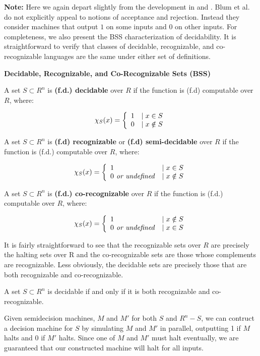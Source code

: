 \textbf{Note:} Here we again depart slightly from the development in
\cite{B89} and \cite{B98}.  Blum et al. do not explicitly appeal to
notions of acceptance and rejection.  Instead they consider machines
that output $1$ on some inputs and $0$ on other inputs.  For
completeness, we also present the BSS characterization of
decidability.  It is straightforward to verify that classes of
decidable, recognizable, and co-recognizable languages are the same
under either set of definitions.

\begin{definition}{\textbf{Decidable, Recognizable, and Co-Recognizable Sets (BSS)}}

  A set $S \subset R^n$ is \textbf{(f.d.) decidable} over $R$ if the
  function  is (f.d) computable over $R$,
  where:
  
  $$\chi_S(x) =  \left\{ \begin{array}{ll} 1 & \mid x \in S \\ 0 & \mid x \notin S \end{array} \right.$$
  \vspace{\baselineskip}
  
  A set $S \subset R^n$ is \textbf{(f.d) recognizable} or
  \textbf{(f.d) semi-decidable} over $R$ if the function
   is (f.d.) computable over $R$, where:
  
  $$\chi_S(x) = \left\{ \begin{array}{ll} 1 & \mid x \in S \\ 0 \text{\emph{ or undefined}} & \mid x \notin S \end{array} \right.$$
  \vspace{\baselineskip}
  
  A set $S \subset R^n$ is \textbf{(f.d.) co-recognizable} over $R$ if
  the function  is (f.d.) computable over $R$,
  where:
  
  $$\chi_S(x) =  \left\{ \begin{array}{ll} 1 & \mid x \notin S \\ 0 \text{\emph{ or undefined}} & \mid x \in S \end{array} \right.$$
  \vspace{\baselineskip}
  
\end{definition}

It is fairly straightforward to see that the recognizable sets over
$R$ are precisely the halting sets over R and the co-recognizable sets
are those whose complements are recognizable. Less obviously, the
decidable sets are precisely those that are both recognizable and
co-recognizable.

\begin{proposition}{A set $S \subset R^n$ is decidable if and only if it is
  both recognizable and co-recognizable.}
\end{proposition}
\begin{proofsketch}
  
  Given semidecision machines, $M$ and $M'$ for both $S$ and $R^n -
  S$, we can contruct a decision machine for $S$ by simulating $M$ and
  $M'$ in parallel, outputting 1 if $M$ halts and 0 if $M'$ halts.
  Since one of $M$ and $M'$ must halt eventually, we are guaranteed
  that our constructed machine will halt for all inputs.


\end{proofsketch}

